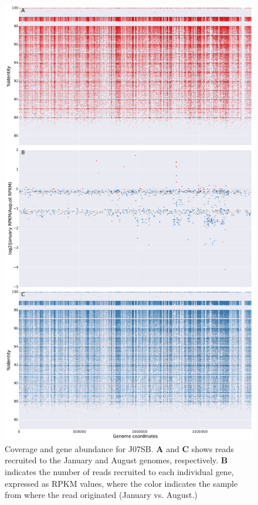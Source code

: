 \begin{figure}[!hbtp]
  \centering
  \includegraphics[width=\textwidth,height=0.8\textheight,keepaspectratio]{Chapter5/Figures/coverage_plots/J07SB_coverage.pdf}
  \caption{Coverage and gene abundance for J07SB. \textbf{A} and \textbf{C} shows reads recruited to the January and August genomes, respectively. \textbf{B} indicates the number of reads recruited to each individual gene, expressed as RPKM values, where the color indicates the sample from where the read originated (January vs. August.)}
  \label{J07SBcoverage}
\end{figure}
